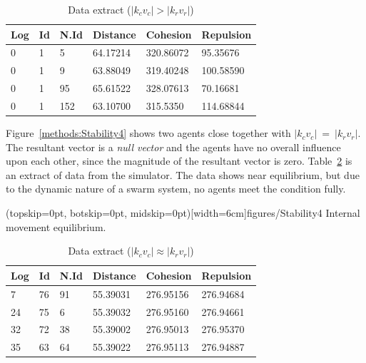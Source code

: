 \documentclass{ieeeaccess}
\begin{document}
\begin{table}[H]
\begin{center}
\begin{tabular}{| l | l | l | l | l | l |}
\hline
Log &	Id &	N.Id &	Distance &	{\color{green}Cohesion} & {\color{red}Repulsion} 	\\ \hline
0 & 1 & 5 &	64.17214 &	{\color{green}320.86072} &	{\color{red}95.35676} \\ \hline
0 & 1 & 9 &	63.88049 &	{\color{green}319.40248} &	{\color{red}100.58590} \\ \hline
0 & 1 & 95 & 65.61522 &	{\color{green}328.07613} &	{\color{red}70.16681} \\ \hline
0 & 1 & 152 & 63.10700 & {\color{green}315.5350} & {\color{red}114.68844} \\ 
\hline
\end{tabular}\caption{Data extract ($|k_cv_c| > |k_rv_r|$)} \label{tab:SampleCohesionPositive}
\end{center}
\end{table}

Figure~\ref{methods:Stability4} shows two agents close together with
$|k_cv_c|~=~|k_rv_r|$. The resultant vector is a \textit{null vector} and the
agents have no overall influence upon each other, since the magnitude of the
resultant vector is zero. Table~\ref{tab:SampleEquilibrium} is an extract of
data from the simulator. The data shows near equilibrium, but due to the dynamic
nature of a swarm system, no agents meet the condition fully. 

\Figure[t!](topskip=0pt, botskip=0pt,
midskip=0pt)[width=6cm]{figures/Stability4} {Internal movement
equilibrium.\label{methods:Stability4}}


\begin{table}[H]
\begin{center}
\begin{tabular}{| l | l | l | l | l | l |}
\hline
Log &	Id &	N.Id &	Distance &	{\color{green}Cohesion} &	{\color{red}Repulsion} 	\\ \hline
7 & 76 &	91 & 55.39031 & {\color{green}276.95156} & {\color{red}276.94684} \\ \hline
24 & 75 & 6 & 55.39032 & {\color{green}276.95160} & {\color{red}276.94661} \\ \hline
32 & 72 & 38 &	55.39002 & {\color{green}276.95013} & {\color{red}276.95370} \\ \hline
35 & 63 & 64 & 55.39022 &	{\color{green}276.95113} &	{\color{red}276.94887} \\
\hline
\end{tabular}\caption{Data extract ($|k_cv_c| \approx |k_rv_r|$)} \label{tab:SampleEquilibrium}
\end{center}
\end{table} 
\end{document}
